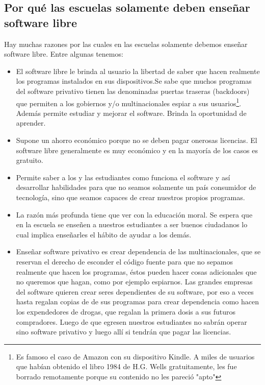 \documentclass[11pt,letterpaper]{article}
\begin{document}
\subsection{Por qué las escuelas solamente deben enseñar software libre}
Hay muchas razones por las cuales en las escuelas solamente debemos enseñar software libre. Entre algunas tenemos:\cite{esc}
\begin{itemize}
\item El software libre le brinda al usuario la libertad de saber que hacen realmente los programas instalados en sus dispositivos.Se sabe que muchos programas del software privativo tienen las denominadas puertas traseras (backdoors) que permiten a los gobiernos y/o multinacionales espiar a sus usuarios\footnote{Es famoso el caso de Amazon con su dispositivo Kindle. A miles de usuarios que habían obtenido el libro 1984 de H.G. Wells gratuitamente, les fue borrado remotamente porque su contenido no les pareció "apto"}. Además permite estudiar y mejorar el software. Brinda la oportunidad de aprender.
\item Supone un ahorro económico porque no se deben pagar onerosas licencias. El software libre generalmente es muy económico y en la mayoría de los casos es gratuito.
\item Permite saber a los y las estudiantes como funciona el software y así desarrollar habilidades para que no seamos solamente un país consumidor de tecnología, sino que seamos capaces de crear nuestros propios programas.
\item La razón más profunda tiene que ver con la educación moral. Se espera que en la escuela se enseñen a nuestros estudiantes a ser buenos ciudadanos lo cual implica enseñarles el hábito de ayudar a los demás.
\item Enseñar software privativo es crear dependencia de las multinacionales, que se reservan el derecho de esconder el código fuente para que no sepamos realmente que hacen los programas, éstos pueden hacer cosas adicionales que no queremos que hagan, como por ejemplo espiarnos. Las grandes empresas del software quieren crear seres dependientes de su software, por eso a veces hasta regalan copias de de sus programas para crear dependencia como hacen los expendedores de drogas, que regalan la primera dosis a sus futuros compradores. Luego de que egresen nuestros estudiantes no sabrán operar sino software privativo y luego allí si tendrán que pagar las licencias. 
\end{itemize}
\end{document}
